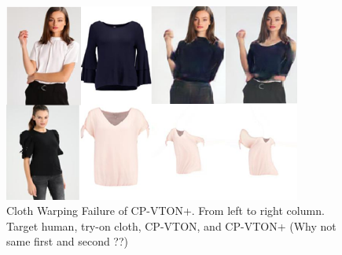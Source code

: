 \begin{figure}
\centering
\includegraphics[height=6.5cm, scale=1]{figures/gmmfailure.png} 
\caption{Cloth Warping Failure of CP-VTON+. From left to right column. Target human, try-on cloth, CP-VTON, and CP-VTON+  (Why not same first and second ??)
}
\label{fig:gmmfailure}
\end{figure}
 